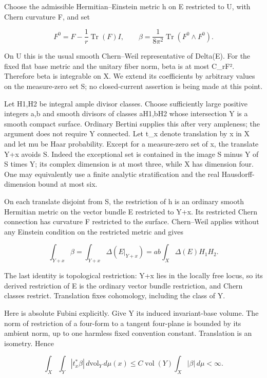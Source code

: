 Choose the admissible Hermitian--Einstein metric h on E restricted to U,
with Chern curvature F, and set

\[
 F^0=F-\frac1r\operatorname{Tr}(F)I,
 \qquad
 \beta=\frac1{8\pi^2}\operatorname{Tr}(F^0\wedge F^0).
 \tag{E834.3}
\]

On U this is the usual smooth Chern--Weil representative of Delta(E).
For the fixed flat base metric and the unitary fiber norm,
\textbar beta\textbar{} is at most C\_r\textbar F\textbar². Therefore
beta is integrable on X. We extend its coefficients by arbitrary values
on the measure-zero set S; no closed-current assertion is being made at
this point.

Let H1,H2 be integral ample divisor classes. Choose sufficiently large
positive integers a,b and smooth divisors of classes aH1,bH2 whose
intersection Y is a smooth compact surface. Ordinary Bertini supplies
this after very ampleness; the argument does not require Y connected.
Let t\_x denote translation by x in X and let mu be Haar probability.
Except for a measure-zero set of x, the translate Y+x avoids S. Indeed
the exceptional set is contained in the image S minus Y of S times Y;
its complex dimension is at most three, while X has dimension four. One
may equivalently use a finite analytic stratification and the real
Hausdorff-dimension bound at most six.

On each translate disjoint from S, the restriction of h is an ordinary
smooth Hermitian metric on the vector bundle E restricted to Y+x. Its
restricted Chern connection has curvature F restricted to the surface.
Chern--Weil applies without any Einstein condition on the restricted
metric and gives

\[
 \int_{Y+x}\beta
   =\int_{Y+x}\Delta(E|_{Y+x})
   =ab\int_X\Delta(E)H_1H_2.
 \tag{E834.4}
\]

The last identity is topological restriction: Y+x lies in the locally
free locus, so its derived restriction of E is the ordinary vector
bundle restriction, and Chern classes restrict. Translation fixes
cohomology, including the class of Y.

Here is absolute Fubini explicitly. Give Y its induced invariant-base
volume. The norm of restriction of a four-form to a tangent four-plane
is bounded by its ambient norm, up to one harmless fixed convention
constant. Translation is an isometry. Hence

\[
 \int_X\int_Y |t_x^*\beta|\,d\mathrm{vol}_Y\,d\mu(x)
 \le C\operatorname{vol}(Y)\int_X|\beta|\,d\mu
 <\infty.
 \tag{E834.5}
\]

